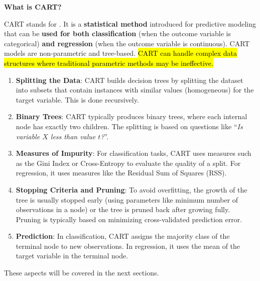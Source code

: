 \begin{flushleft}
    \textcolor{Green3}{ \textbf{What is CART?}}
\end{flushleft}
CART stands for . It is a \textbf{statistical method} introduced for predictive modeling that can be \textbf{used for both classification} (when the outcome variable is categorical) \textbf{and regression} (when the outcome variable is continuous). CART models are non-parametric and tree-based. \hl{CART can handle complex data structures where traditional parametric methods may be ineffective.}\cite{johnson2007applied}
\begin{enumerate}
    \item \textbf{Splitting the Data}: CART builds decision trees by splitting the dataset into subsets that contain instances with similar values (homogeneous) for the target variable. This is done recursively.
    \item \textbf{Binary Trees}: CART typically produces binary trees, where each internal node has exactly two children. The splitting is based on questions like ``\emph{Is variable $X$ less than value $t$?}''.
    \item \textbf{Measures of Impurity}: For classification tasks, CART uses measures such as the Gini Index or Cross-Entropy to evaluate the quality of a split. For regression, it uses measures like the Residual Sum of Squares (RSS).
    \item \textbf{Stopping Criteria and Pruning}: To avoid overfitting, the growth of the tree is usually stopped early (using parameters like minimum number of observations in a node) or the tree is pruned back after growing fully. Pruning is typically based on minimizing cross-validated prediction error.
    \item \textbf{Prediction}: In classification, CART assigns the majority class of the terminal node to new observations. In regression, it uses the mean of the target variable in the terminal node.
\end{enumerate}
These aspects will be covered in the next sections.